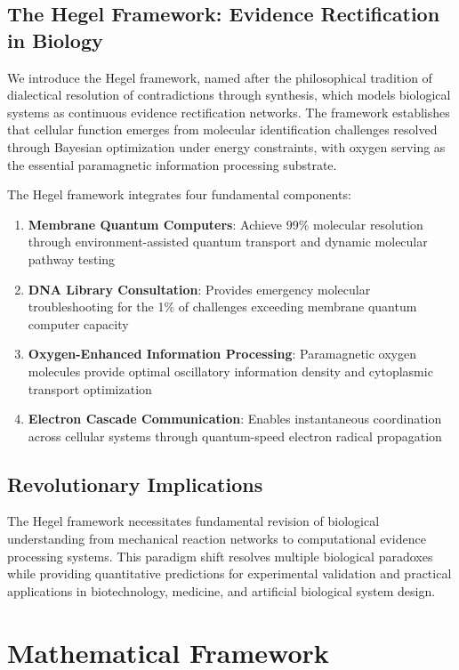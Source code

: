 \documentclass[12pt,a4paper]{article}
\begin{document}
\subsection{The Hegel Framework: Evidence Rectification in Biology}

We introduce the Hegel framework, named after the philosophical tradition of dialectical resolution of contradictions through synthesis, which models biological systems as continuous evidence rectification networks. The framework establishes that cellular function emerges from molecular identification challenges resolved through Bayesian optimization under energy constraints, with oxygen serving as the essential paramagnetic information processing substrate.

The Hegel framework integrates four fundamental components:

\begin{enumerate}
\item \textbf{Membrane Quantum Computers}: Achieve 99\% molecular resolution through environment-assisted quantum transport and dynamic molecular pathway testing
\item \textbf{DNA Library Consultation}: Provides emergency molecular troubleshooting for the 1\% of challenges exceeding membrane quantum computer capacity
\item \textbf{Oxygen-Enhanced Information Processing}: Paramagnetic oxygen molecules provide optimal oscillatory information density and cytoplasmic transport optimization
\item \textbf{Electron Cascade Communication}: Enables instantaneous coordination across cellular systems through quantum-speed electron radical propagation
\end{enumerate}

\subsection{Revolutionary Implications}

The Hegel framework necessitates fundamental revision of biological understanding from mechanical reaction networks to computational evidence processing systems. This paradigm shift resolves multiple biological paradoxes while providing quantitative predictions for experimental validation and practical applications in biotechnology, medicine, and artificial biological system design.

\section{Mathematical Framework}
\end{document}
